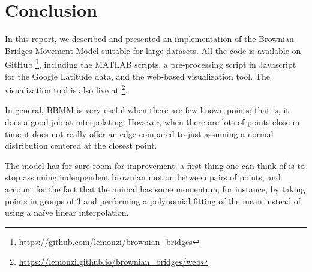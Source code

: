 \documentclass[12pt]{article}
\begin{document}
\clearpage
\section{Conclusion}

In this report, we described and presented an implementation of the Brownian Bridges Movement Model suitable for large datasets. All the code is available on GitHub \footnote{\url{https://github.com/lemonzi/brownian_bridges}}, including the MATLAB scripts, a pre-processing script in Javascript for the Google Latitude data, and the web-based visualization tool. The visualization tool is also live at \footnote{\url{https://lemonzi.github.io/brownian_bridges/web}}.

In general, BBMM is very useful when there are few known points; that is, it does a good job at interpolating. However, when there are lots of points close in time it does not really offer an edge compared to just assuming a normal distribution centered at the closest point.

The model has for sure room for improvement; a first thing one can think of is to stop assuming indenpendent brownian motion between pairs of points, and account for the fact that the animal has some momentum; for instance, by taking points in groups of 3 and performing a polynomial fitting of the mean instead of using a naïve linear interpolation.

\end{document}
